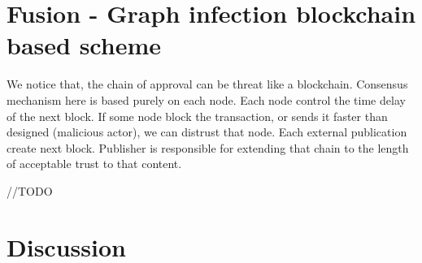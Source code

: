 \documentclass[nostrict]{szablonPG}
\begin{document}
\section{Fusion - Graph infection blockchain based scheme}
We notice that, the chain of approval can be threat like a blockchain. Consensus mechanism here is based purely on each node. Each node control the time delay of the next block. If some node block the transaction, or sends it faster than designed (malicious actor), we can distrust that node. Each external publication create next block. Publisher is responsible for extending that chain to the length of acceptable trust to that content.

//TODO

\section{Discussion}



\end{document}
